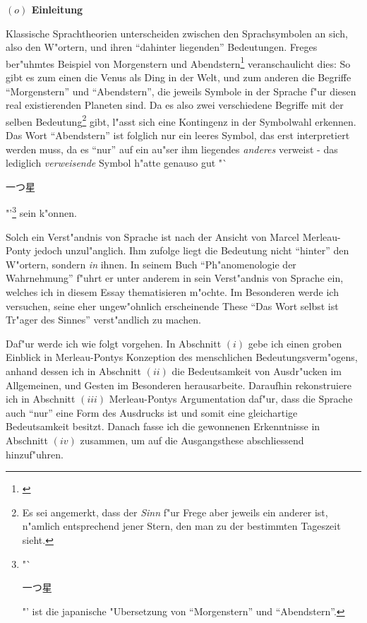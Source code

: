 \documentclass[a4paper, 12pt]{article}
\begin{document}
\begin{onehalfspace} 

\noindent\textbf{$(o)$ Einleitung}

\noindent Klassische Sprachtheorien unterscheiden zwischen den Sprachsymbolen an sich, also den W"ortern, und ihren "`dahinter liegenden"' Bedeutungen. Freges ber"uhmtes Beispiel von Morgenstern und Abendstern\footnote{\cite{sinnundbedeutung}} veranschaulicht dies: So gibt es zum einen die Venus als Ding in der Welt, und zum anderen die Begriffe "`Morgenstern"' und "`Abendstern"', die jeweils Symbole in der Sprache f"ur diesen real existierenden Planeten sind. Da es also zwei verschiedene Begriffe mit der selben Bedeutung\footnote{Es sei angemerkt, dass der \emph{Sinn} f"ur Frege aber jeweils ein anderer ist, n"amlich entsprechend jener Stern, den man zu der bestimmten Tageszeit sieht.} gibt, l"asst sich eine Kontingenz in der Symbolwahl erkennen. Das Wort "`Abendstern"' ist folglich nur ein leeres Symbol, das erst interpretiert werden muss, da es "`nur"' auf ein au"ser ihm liegendes \emph{anderes} verweist - das lediglich \emph{verweisende} Symbol h"atte genauso gut "`\begin{CJK}{UTF8}{min}一つ星\end{CJK}"'\footnote{"`\begin{CJK}{UTF8}{min}一つ星\end{CJK}"' ist die japanische "Ubersetzung von "`Morgenstern"' und "`Abendstern"'.} sein k"onnen.

Solch ein Verst"andnis von Sprache ist nach der Ansicht von Marcel Merleau-Ponty jedoch unzul"anglich. Ihm zufolge liegt die Bedeutung nicht "`hinter"' den W"ortern, sondern \emph{in} ihnen. In seinem Buch "`Ph"anomenologie der Wahrnehmung"' \citep{merleau1966phanomenologie} f"uhrt er unter anderem in sein Verst"andnis von Sprache ein, welches ich in diesem Essay thematisieren m"ochte. Im Besonderen werde ich versuchen, seine eher ungew"ohnlich erscheinende These "`Das Wort selbst ist Tr"ager des Sinnes"' verst"andlich zu machen.\newline

Daf"ur werde ich wie folgt vorgehen. In Abschnitt $(i)$ gebe ich einen groben Einblick in Merleau-Pontys Konzeption des menschlichen Bedeutungsverm"ogens, anhand dessen ich in Abschnitt $(ii)$ die Bedeutsamkeit von Ausdr"ucken im Allgemeinen, und Gesten im Besonderen herausarbeite. Daraufhin rekonstruiere ich in Abschnitt $(iii)$ Merleau-Pontys Argumentation daf"ur, dass die Sprache auch "`nur"' eine Form des Ausdrucks ist und somit eine gleichartige Bedeutsamkeit besitzt. Danach fasse ich die gewonnenen Erkenntnisse in Abschnitt $(iv)$ zusammen, um auf die Ausgangsthese abschliessend hinzuf"uhren.


\end{onehalfspace}
\end{document}
